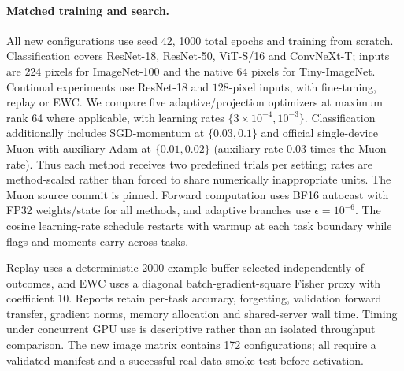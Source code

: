 \paragraph{Matched training and search.}
All new configurations use seed 42, 1000 total epochs and training from scratch. Classification covers ResNet-18, ResNet-50, ViT-S/16 and ConvNeXt-T; inputs are $224$ pixels for ImageNet-100 and the native $64$ pixels for Tiny-ImageNet. Continual experiments use ResNet-18 and $128$-pixel inputs, with fine-tuning, replay or EWC. We compare five adaptive/projection optimizers at maximum rank 64 where applicable, with learning rates $\{3\times10^{-4},10^{-3}\}$. Classification additionally includes SGD-momentum at $\{0.03,0.1\}$ and official single-device Muon with auxiliary Adam at $\{0.01,0.02\}$ (auxiliary rate $0.03$ times the Muon rate). Thus each method receives two predefined trials per setting; rates are method-scaled rather than forced to share numerically inappropriate units. The Muon source commit is pinned. Forward computation uses BF16 autocast with FP32 weights/state for all methods, and adaptive branches use $\epsilon=10^{-6}$. The cosine learning-rate schedule restarts with warmup at each task boundary while flags and moments carry across tasks.

Replay uses a deterministic 2000-example buffer selected independently of outcomes, and EWC uses a diagonal batch-gradient-square Fisher proxy with coefficient 10. Reports retain per-task accuracy, forgetting, validation forward transfer, gradient norms, memory allocation and shared-server wall time. Timing under concurrent GPU use is descriptive rather than an isolated throughput comparison. The new image matrix contains 172 configurations; all require a validated manifest and a successful real-data smoke test before activation.
